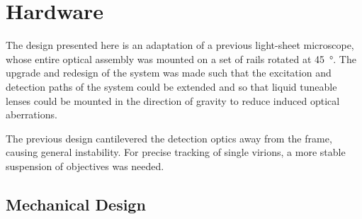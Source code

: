 %
%
%
%
%

\section{Hardware}

The design presented here is an adaptation of a previous light-sheet microscope, whose entire optical assembly was mounted on a set of rails rotated at \SI{45}{\degree}.
The upgrade and redesign of the system was made such that the excitation and detection paths of the system could be extended and so that liquid tuneable lenses could be mounted in the direction of gravity to reduce induced optical aberrations.

The previous design cantilevered the detection optics away from the frame, causing general instability.
For precise tracking of single virions, a more stable suspension of objectives was needed.

\subsection{Mechanical Design}

